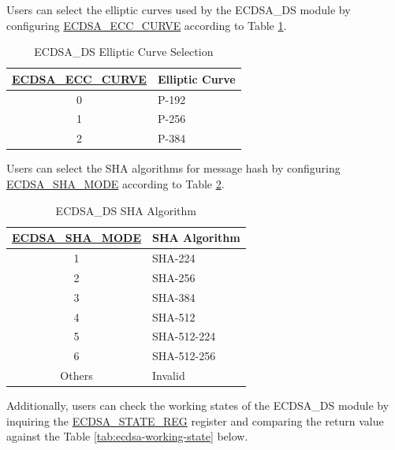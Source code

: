 \documentclass[main\_\_EN.tex]{subfiles}
\begin{document}
Users can select the elliptic curves used by the ECDSA\_DS module by configuring \hyperref[fielddesc:ECDSAECCCURVE]{ECDSA\_ECC\_CURVE} according to Table \ref{tab:ecdsa-curve-selection}.

\begin{table}[H]
    \centering
    \caption{ECDSA\_DS Elliptic Curve Selection}
    \label{tab:ecdsa-curve-selection}
    \begin{tabular}{ | c | l | }
    \hline
        \rowcolor{lightgray}
        \textbf{\hyperref[fielddesc:ECDSAECCCURVE]{ECDSA\_ECC\_CURVE}}      & \textbf{Elliptic Curve}\\
        \hline
        0                       & P-192    \\\hline
        1                       & P-256    \\\hline
        2                       & P-384    \\\hline
    \end{tabular}
\end{table}

Users can select the SHA algorithms for message hash by configuring \hyperref[fielddesc:ECDSASHAMODE]{ECDSA\_SHA\_MODE} according to Table \ref{tab:ecdsa-sha-algorithms}.

\begin{table}[H]
    \centering
    \caption{ECDSA\_DS SHA Algorithm}
    \label{tab:ecdsa-sha-algorithms}
    \begin{tabular}{ | c | l | }
    \hline
        \rowcolor{lightgray}
        \textbf{\hyperref[fielddesc:ECDSASHAMODE]{ECDSA\_SHA\_MODE}}      & \textbf{SHA Algorithm}\\
        \hline
        1                       & SHA-224    \\\hline
        2                       & SHA-256    \\\hline
        3                       & SHA-384    \\\hline
        4                       & SHA-512    \\\hline
        5                       & SHA-512-224    \\\hline
        6                       & SHA-512-256    \\\hline
        Others                  & Invalid    \\\hline
    \end{tabular}
\end{table}

Additionally, users can check the working states of the ECDSA\_DS module by inquiring the \hyperref[regdesc:ECDSASTATEREG]{ECDSA\_STATE\_REG} register and comparing the return value against the Table \ref{tab:ecdsa-working-state} below.
\end{document}
